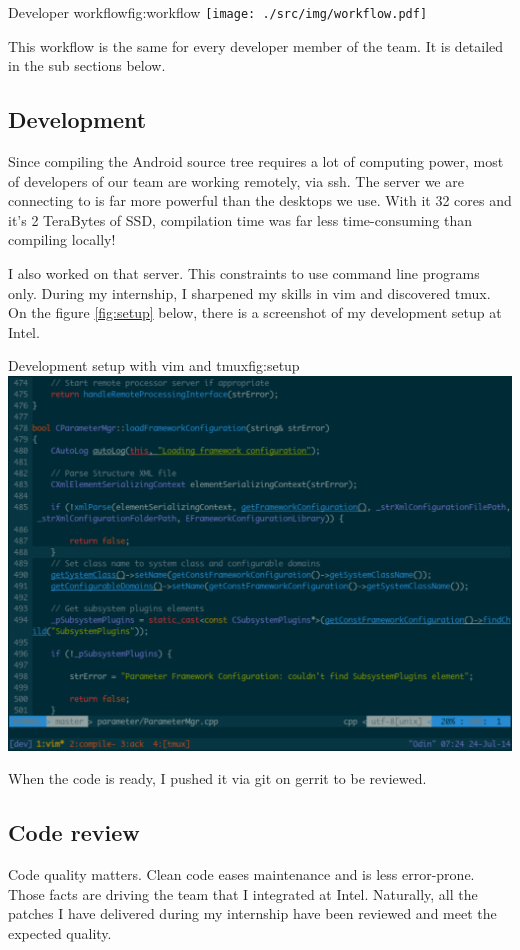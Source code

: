 \begin{figureGraphics}{Developer workflow}{fig:workflow}
    \texttt{[image: ./src/img/workflow.pdf]}
\end{figureGraphics}

This workflow is the same for every developer member of the team. It is
detailed in the sub sections below.

\subsection{Development}
Since compiling the Android source tree requires a lot of computing power,
most of developers of our team are working remotely, via ssh.
The server we are connecting to is far more powerful than the desktops we use.
With it 32 cores and it's 2 TeraBytes of SSD, compilation time was far less time-consuming
than compiling locally!

I also worked on that server. This constraints to use command line programs only.
During my internship, I sharpened my skills in \gls{vim} and discovered \gls{tmux}.
On the figure \ref{fig:setup} below, there is a screenshot of my development setup at Intel.

\begin{figureGraphics}{Development setup with vim and tmux}{fig:setup}
\includegraphics[width=\textwidth]{./src/img/setup.pdf}
\end{figureGraphics}

When the code is ready, I pushed it via \gls{git} on \gls{gerrit} to be reviewed.

\subsection{Code review}
Code quality matters. Clean code eases maintenance and is less error-prone.
Those facts are driving the team that I integrated at Intel. Naturally, all the
patches I have delivered during my internship have been reviewed and meet the
expected quality.

